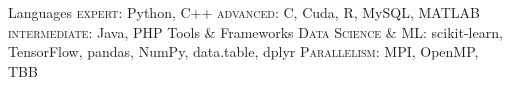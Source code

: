 \begin{cvskills}
  \cvskill
    {Languages} %
    {\textsc{expert}: Python, C++ \quad \textsc{advanced}: C, Cuda, R, MySQL, MATLAB \quad \textsc{intermediate}: Java, PHP} %
  \cvskill
    {Tools \& Frameworks} %
    {\textsc{Data Science \& ML}: scikit-learn, TensorFlow, pandas, NumPy, data.table, dplyr \quad \textsc{Parallelism}: MPI, OpenMP, TBB} %
\end{cvskills}
